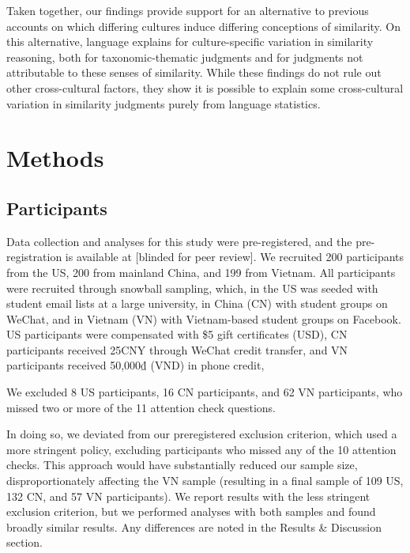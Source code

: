 \documentclass[10pt, letterpaper]{article}
\begin{document}
Taken together, our findings provide support for an alternative to
previous accounts on which differing cultures induce differing
conceptions of similarity. On this alternative, language explains for
culture-specific variation in similarity reasoning, both for
taxonomic-thematic judgments and for judgments not attributable to these
senses of similarity. While these findings do not rule out other
cross-cultural factors, they show it is possible to explain some
cross-cultural variation in similarity judgments purely from language
statistics.

\hypertarget{methods}{%
\section{Methods}\label{methods}}

\hypertarget{participants}{%
\subsection{Participants}\label{participants}}

Data collection and analyses for this study were pre-registered, and the
pre-registration is available at {[}blinded for peer review{]}. We
recruited 200 participants from the US, 200 from mainland China, and 199
from Vietnam. All participants were recruited through snowball sampling,
which, in the US was seeded with student email lists at a large
university, in China (CN) with student groups on WeChat, and in Vietnam
(VN) with Vietnam-based student groups on Facebook. US participants were
compensated with \$5 gift certificates (USD), CN participants received
25CNY through WeChat credit transfer, and VN participants received
50,000₫ (VND) in phone credit,

We excluded 8 US participants, 16 CN participants, and 62 VN
participants, who missed two or more of the 11 attention check
questions.

In doing so, we deviated from our preregistered exclusion criterion,
which used a more stringent policy, excluding participants who missed
any of the 10 attention checks. This approach would have substantially
reduced our sample size, disproportionately affecting the VN sample
(resulting in a final sample of 109 US, 132 CN, and 57 VN participants).
We report results with the less stringent exclusion criterion, but we
performed analyses with both samples and found broadly similar results.
Any differences are noted in the Results \& Discussion section.
\end{document}
